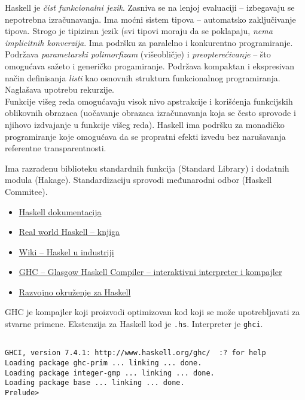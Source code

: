 \documentclass[../main.tex]{subfiles}
\begin{document}
 \hfill

Haskell je {\it čist funkcionalni jezik}. Zasniva se na lenjoj evaluaciji -- izbegavaju se nepotrebna izračunavanja. Ima moćni sistem tipova -- automatsko zaključivanje tipova. Strogo je tipiziran jezik (svi tipovi moraju da se poklapaju, {\it nema implicitnih konverzija}. Ima podršku za paralelno i konkurentno programiranje.
\\
Podržava {\it parametarski polimorfizam} (višeobličje) i {\it preopterećivanje} -- što omogućava sažeto i generičko progamiranje. Podržava kompaktan i ekspresivan način definisanja {\it listi} kao osnovnih struktura funkcionalnog programiranja. Naglašava upotrebu rekurzije.
\\
Funkcije višeg reda omogućavaju visok nivo apstrakcije i korišćenja funkcijskih oblikovnih obrazaca (uočavanje obrazaca izračunavanja koja se često sprovode i njihovo izdvajanje u funkcije višeg reda). Haskell ima podršku za monadičko programiranje koje omogućava da se propratni efekti izvedu bez narušavanja referentne transparentnosti.

Ima razrađenu biblioteku standardnih funkcija (Standard Library) i dodatnih modula (Hakage). Standardizaciju sprovodi međunarodni odbor (Haskell Commitee).

\begin{itemize}
\item \href{http://www.haskell.org/documentation}{Haskell dokumentacija}
\item \href{http://book.realworldhaskell.org/}{Real world Haskell -- knjiga}
\item \href{http://wiki.haskell.org/Haskell_in_industry}{Wiki -- Haskel u industriji}
\item \href{http://www.haskell.org/ghc/}{GHC -- Glasgow Haskell Compiler -- interaktivni interpreter i kompajler}
\item \href{http://wiki.haskell.org/IDEs}{Razvojno okruženje za Haskell}
\end{itemize}
GHC je kompajler koji proizvodi optimizovan kod koji se može upotrebljavati za stvarne primene. Ekstenzija za Haskell kod je \texttt{.hs}. Interpreter je \texttt{ghci}.

\begin{boxprimer}
\begin{Verbatim}

GHCI, version 7.4.1: http://www.haskell.org/ghc/  :? for help
Loading package ghc-prim ... linking ... done.
Loading package integer-gmp ... linking ... done.
Loading package base ... linking ... done.
Prelude>

\end{Verbatim}
\end{boxprimer}
\end{document}
